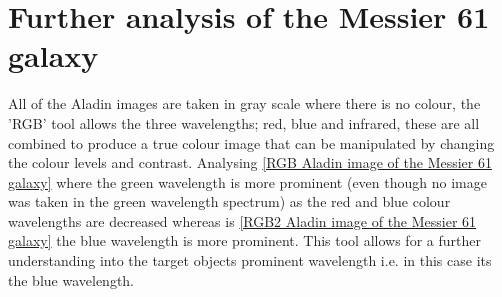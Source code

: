 \documentclass[12pt]{article}
\begin{document}
\section{Further analysis of the Messier 61 galaxy}
\label{Section 3}

All of the Aladin images are taken in gray scale where there is no colour, the 'RGB' tool allows the three wavelengths; red, blue and infrared, these are all combined to produce a true colour image that can be manipulated by changing the colour levels and contrast. Analysing \cref{RGB Aladin image of the Messier 61 galaxy} where the green wavelength is more prominent (even though no image was taken in the green wavelength spectrum) as the red and blue colour wavelengths are decreased whereas is \cref{RGB2 Aladin image of the Messier 61 galaxy} the blue wavelength is more prominent. This tool allows for a further understanding into the target objects prominent wavelength i.e. in this case its the blue wavelength. \\
\end{document}
